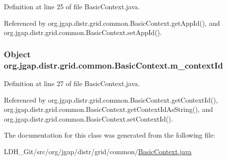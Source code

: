 Definition at line 25 of file Basic\-Context.\-java.



Referenced by org.\-jgap.\-distr.\-grid.\-common.\-Basic\-Context.\-get\-App\-Id(), and org.\-jgap.\-distr.\-grid.\-common.\-Basic\-Context.\-set\-App\-Id().

\hypertarget{classorg_1_1jgap_1_1distr_1_1grid_1_1common_1_1_basic_context_a4405e07a69a3fc4ce5c8614f275e5df8}{
\subsubsection[{m\-\_\-context\-Id}]{\setlength{\rightskip}{0pt plus 5cm}Object org.\-jgap.\-distr.\-grid.\-common.\-Basic\-Context.\-m\-\_\-context\-Id\hspace{0.3cm}{\ttfamily [private]}}}\label{classorg_1_1jgap_1_1distr_1_1grid_1_1common_1_1_basic_context_a4405e07a69a3fc4ce5c8614f275e5df8}


Definition at line 27 of file Basic\-Context.\-java.



Referenced by org.\-jgap.\-distr.\-grid.\-common.\-Basic\-Context.\-get\-Context\-Id(), org.\-jgap.\-distr.\-grid.\-common.\-Basic\-Context.\-get\-Context\-Id\-As\-String(), and org.\-jgap.\-distr.\-grid.\-common.\-Basic\-Context.\-set\-Context\-Id().



The documentation for this class was generated from the following file\-:\begin{DoxyCompactItemize}
\item 
L\-D\-H\-\_\-\-Git/src/org/jgap/distr/grid/common/\hyperlink{_basic_context_8java}{Basic\-Context.\-java}\end{DoxyCompactItemize}

